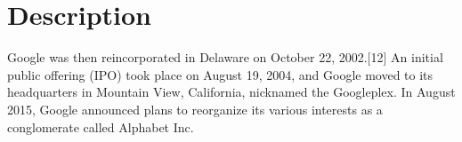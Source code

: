 \chapter{Description}
 Google was then reincorporated in Delaware on October 22, 2002.[12] An initial public offering (IPO) took place on August 19, 2004, and Google moved to its headquarters in Mountain View, California, nicknamed the Googleplex. In August 2015, Google announced plans to reorganize its various interests as a conglomerate called Alphabet Inc.